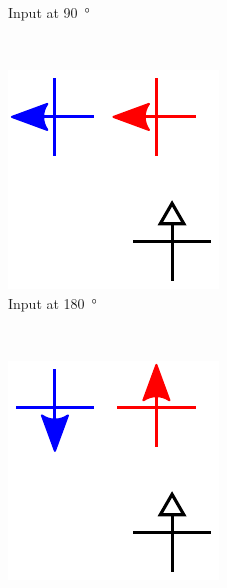 \documentclass[11pt,a4paper,english]{article}
\newcommand{\rulesep}{\unskip\ \vrule\ }
\begin{document}
\begin{figure}
\begin{subfigure}[t]{0.23\textwidth}
    \caption{Input at \SI{90}{\degree}}
\end{subfigure}
\rulesep
\begin{subfigure}[t]{0.23\textwidth}
    \includegraphics[width=\textwidth]{Figures/half_adder/schematic/000006_inputs_In1_0213/Input 180 deg.pdf}
    \caption{Input at \SI{180}{\degree}}
\end{subfigure}
\rulesep
\begin{subfigure}[t]{0.23\textwidth}
    \includegraphics[width=\textwidth]{Figures/half_adder/schematic/000006_inputs_In1_0213/Input 270 deg.pdf}

\end{subfigure}
\end{figure}
\end{document}
